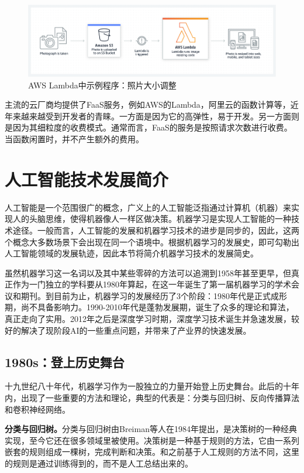 \begin{figure}
    \centerline{\includegraphics[width=\textwidth]{figures/aws-lambda-resize.png}}
    \caption{AWS Lambda中示例程序：照片大小调整}
    \label{aws_resize}
\end{figure}

主流的云厂商均提供了FaaS服务，例如AWS的Lambda，阿里云的函数计算等，近年来越来越受到开发者的青睐。一方面是因为它的高弹性，易于开发。另一方面则是因为其细粒度的收费模式。通常而言，FaaS的服务是按照请求次数进行收费。当函数闲置时，并不产生额外的费用。

\section{人工智能技术发展简介}\label{sec_ml_history}
人工智能是一个范围很广的概念，广义上的人工智能泛指通过计算机（机器）来实现人的头脑思维，使得机器像人一样区做决策。机器学习是实现人工智能的一种技术途径。一般而言，人工智能的发展和机器学习技术的进步是同步的，因此，这两个概念大多数场景下会出现在同一个语境中。根据机器学习的发展史，即可勾勒出人工智能领域的发展轨迹，因此本节将简介机器学习技术的发展简史。

虽然机器学习这一名词以及其中某些零碎的方法可以追溯到1958年甚至更早，但真正作为一门独立的学科要从1980年算起，在这一年诞生了第一届机器学习的学术会议和期刊。到目前为止，机器学习的发展经历了3个阶段：1980年代是正式成形期，尚不具备影响力。1990-2010年代是蓬勃发展期，诞生了众多的理论和算法，真正走向了实用。2012年之后是深度学习时期，深度学习技术诞生并急速发展，较好的解决了现阶段AI的一些重点问题，并带来了产业界的快速发展。

\subsection{1980s：登上历史舞台}
十九世纪八十年代，机器学习作为一股独立的力量开始登上历史舞台。此后的十年内，出现了一些重要的方法和理论，典型的代表是：分类与回归树、反向传播算法和卷积神经网络。

\textbf{分类与回归树。}分类与回归树由Breiman等人在1984年提出，是决策树的一种经典实现，至今它还在很多领域里被使用。决策树是一种基于规则的方法，它由一系列嵌套的规则组成一棵树，完成判断和决策。和之前基于人工规则的方法不同，这里的规则是通过训练得到的，而不是人工总结出来的。

